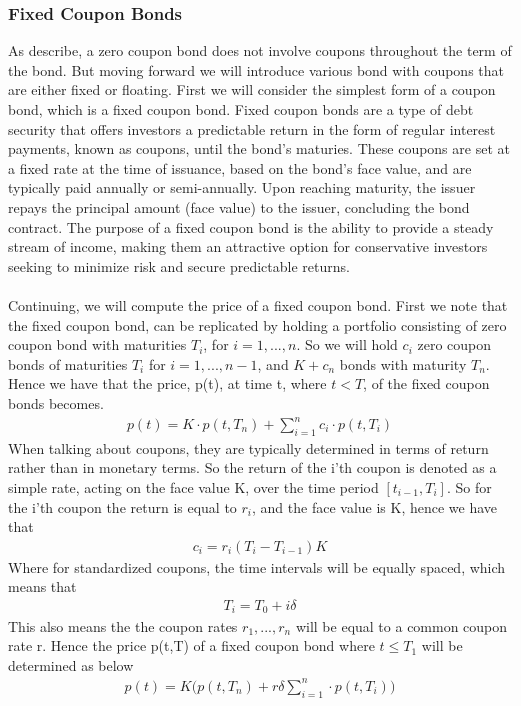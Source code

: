 \subsubsection{Fixed Coupon Bonds}
As describe, a zero coupon bond does not involve coupons throughout the term of the bond. 
But moving forward we will introduce various bond with coupons that are either fixed 
or floating. First we will consider the simplest form of a coupon bond, which is a 
fixed coupon bond. Fixed coupon bonds are a type of debt security that offers investors a predictable
return in the form of regular interest payments, known as coupons, until the bond's maturies.
These coupons are set at a fixed rate at the time of issuance, based on the bond's face value,
and are typically paid annually or semi-annually. Upon reaching maturity, the issuer repays 
the principal amount (face value) to the issuer, concluding the bond contract. The purpose
of a fixed coupon bond is the ability to provide a steady stream of income,
making them an attractive option for conservative investors seeking to minimize risk and 
secure predictable returns.
\\\\
Continuing, we will compute the price of a fixed coupon bond. First we note that the fixed coupon bond,
can be replicated by holding a portfolio consisting of zero coupon bond with maturities $T_i$, for 
$i=1,...,n$. So we will hold $c_i$ zero coupon bonds of maturities $T_i$ for $i=1,...,n-1$, and 
$K+c_n$ bonds with maturity $T_n$. Hence we have that the price, p(t), at time t, where $t<T$, of 
the fixed coupon bonds becomes. \cite{Bjork}
\begin{align*}
    p(t) = K \cdot p(t,T_n) + \sum_{i=1}^{n}c_i \cdot p(t,T_i)
\end{align*}
When talking about coupons, they are typically determined in terms of return rather than in monetary terms.
So the return of the i'th coupon is denoted as a simple rate, acting on the face value K, over the
time period $[t_{i-1},T_i]$. So for the i'th coupon the return is equal to $r_i$, and the face value 
is K, hence we have that 
\begin{align*}
    c_i = r_i(T_i-T_{i-1})K
\end{align*}
Where for standardized coupons, the time intervals will be equally spaced, which means that 
\begin{align*}
    T_i = T_0 + i \delta
\end{align*}
This also means the the coupon rates $r_1,...,r_n$ will be equal to a common coupon rate r. 
Hence the price p(t,T) of a fixed coupon bond where $t \leq T_1$ will be determined as below \cite{Bjork}
\begin{align*}
    p(t)= K \Big( p(t,T_n)+ r \delta \sum_{i=1}^{n}\cdot p(t,T_i) \Big)
\end{align*}
